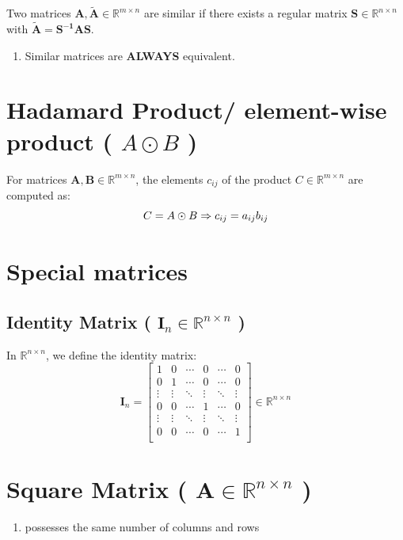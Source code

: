 Two matrices $\mathbf{A, \tilde{A}} \in \mathbb{R}^{m\times n}$ are similar if there exists a regular matrix $\mathbf{S} \in \mathbb{R}^{n\times n}$ with $\mathbf{\tilde{A} = S^{-1}AS}$.

\begin{enumerate}
    \item Similar matrices are \textbf{ALWAYS} equivalent.
\end{enumerate}


\section{Hadamard Product/ element-wise product ( $A \odot B$ )}\label{matrix: Hadamard Product/ element-wise product}

For matrices $\mathbf{A, B} \in \mathbb{R}^{m\times n}$, the elements $c_{ij}$ of the product $C \in \mathbb{R}^{m\times n}$ are computed as:
\[
    \hfill
    C = A \odot B 
    \Rightarrow c_{ij} = a_{ij}b_{ij}
    \hfill
\]


\section{Special matrices}

\subsection{Identity Matrix ( $\mathbf{I}_n \in \mathbb{R}^{n\times n}$ ) \cite{mfml-1}}\label{Identity Matrix}
In $\mathbb{R}^{n\times n}$, we define the identity matrix:
\[
    \renewcommand{\arraystretch}{0.6}
    \mathbf{I}_n = \begin{bmatrix}
        1 & 0 & \cdots & 0 & \cdots & 0 \\
        0 & 1 & \cdots & 0 & \cdots & 0 \\
        \vdots & \vdots & \ddots & \vdots & \ddots & \vdots \\
        0 & 0 & \cdots & 1 & \cdots & 0 \\
        \vdots & \vdots & \ddots & \vdots & \ddots & \vdots \\
        0 & 0 & \cdots & 0 & \cdots & 1 \\
    \end{bmatrix} \in \mathbb{R}^{n\times n}
\]


\section{Square Matrix ( $\mathbf{A} \in \mathbb{R}^{n\times n}$ ) \cite{mfml-1}}\label{Square Matrix}
\begin{enumerate}
    \item possesses the same number of columns and rows
\end{enumerate}

